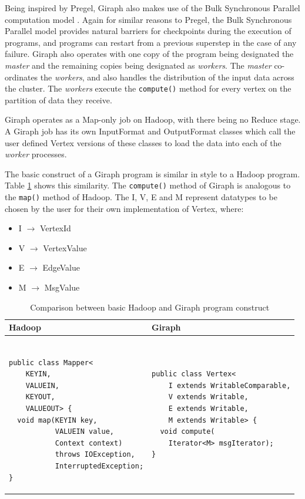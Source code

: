 Being inspired by Pregel, Giraph also makes use of the Bulk Synchronous Parallel computation model \cite{bsp}. Again for similar reasons to Pregel, the Bulk Synchronous Parallel model provides natural barriers for checkpoints during the execution of programs, and programs can restart from a previous superstep in the case of any failure. Giraph also operates with one copy of the program being designated the \emph{master} and the remaining copies being designated as \emph{workers}. The \emph{master} co-ordinates the \emph{workers}, and also handles the distribution of the input data across the cluster. The \emph{workers} execute the \verb/compute()/ method for every vertex on the partition of data they receive.

Giraph operates as a Map-only job on Hadoop, with there being no Reduce stage. A Giraph job has its own InputFormat and OutputFormat classes which call the user defined Vertex versions of these classes to load the data into each of the \emph{worker} processes.

The basic construct of a Giraph program is similar in style to a Hadoop program. Table \ref{tab:hadoopgiraph} shows this similarity. The \verb/compute()/ method of Giraph is analogous to the \verb/map()/ method of Hadoop. The I, V, E and M represent datatypes to be chosen by the user for their own implementation of Vertex, where:

\begin{itemize}
	\item I $\rightarrow$ VertexId
	\item V $\rightarrow$ VertexValue
	\item E $\rightarrow$ EdgeValue
	\item M $\rightarrow$ MsgValue
\end{itemize}

\begin{table}%
\centering
\begin{tabular}{|m{7.25cm}|m{7.25cm}|} \hline
Hadoop & Giraph \\ \hline
\begin{verbatim}

public class Mapper<
    KEYIN,
    VALUEIN,
    KEYOUT,
    VALUEOUT> {
  void map(KEYIN key,
           VALUEIN value,
           Context context)
           throws IOException,
           InterruptedException;
}
\end{verbatim} &
\begin{verbatim}
public class Vertex<
    I extends WritableComparable,
    V extends Writable,
    E extends Writable,
    M extends Writable> {
  void compute(
    Iterator<M> msgIterator);
}
\end{verbatim} \\
\hline
\end{tabular}
\caption{Comparison between basic Hadoop and Giraph program construct \cite{giraphtalk}}
\label{tab:hadoopgiraph}
\end{table}
